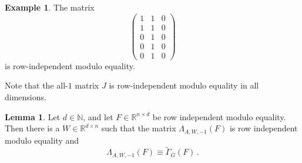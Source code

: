 \documentclass[letterpaper]{article}
\theoremstyle{definition}
\newtheorem{lemma}[theorem]{Lemma}
\newtheorem{example}[theorem]{Example}
\newcommand{\RR}{\mathbb{R}}
\newcommand{\NN}{\mathbb{N}}
\begin{document}
\begin{example}
	The matrix
	\[
		\begin{pmatrix}
			1 & 1 & 0 \\
			1 & 1 & 0 \\
			0 & 1 & 0 \\
			0 & 1 & 0 \\
			0 & 1 & 0 
		\end{pmatrix}
	\]
	is row-independent modulo equality.
\end{example}
Note that the all-$1$ matrix $J$ is row-independent modulo equality in all dimensions.
\begin{lemma}\label{lem:equivalencePerStep}
	Let $d\in\NN$, and let  $F\in\RR^{n\times d}$ be row independent modulo equality. 
	Then there is a $W\in\RR^{d\times n}$ such that the matrix $\Lambda_{A,W,-1}(F)$ is row independent modulo equality and
	\begin{equation*}
		\Lambda_{A,W,-1}(F)\equiv \tilde\Gamma_G(F)\,.
	\end{equation*}
\end{lemma}
\end{document}
